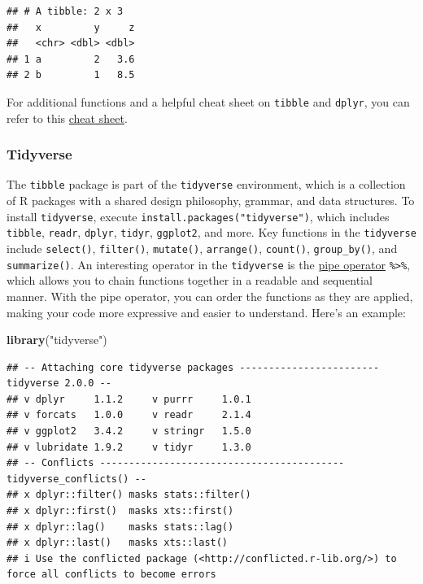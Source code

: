 \documentclass[
]{book}
\newenvironment{Shaded}{\begin{snugshade}}{\end{snugshade}}
\newcommand{\FunctionTok}[1]{\textcolor[rgb]{0.13,0.29,0.53}{\textbf{#1}}}
\newcommand{\NormalTok}[1]{#1}
\newcommand{\StringTok}[1]{\textcolor[rgb]{0.31,0.60,0.02}{#1}}
\begin{document}
\begin{verbatim}
## # A tibble: 2 x 3
##   x         y     z
##   <chr> <dbl> <dbl>
## 1 a         2   3.6
## 2 b         1   8.5
\end{verbatim}

For additional functions and a helpful cheat sheet on \texttt{tibble} and \texttt{dplyr}, you can refer to this \href{https://github.com/rstudio/cheatsheets/raw/master/data-transformation.pdf}{cheat sheet}.

\hypertarget{tidyverse}{%
\subsubsection*{Tidyverse}\label{tidyverse}}

The \texttt{tibble} package is part of the \texttt{tidyverse} environment, which is a collection of R packages with a shared design philosophy, grammar, and data structures. To install \texttt{tidyverse}, execute \texttt{install.packages("tidyverse")}, which includes \texttt{tibble}, \texttt{readr}, \texttt{dplyr}, \texttt{tidyr}, \texttt{ggplot2}, and more. Key functions in the \texttt{tidyverse} include \texttt{select()}, \texttt{filter()}, \texttt{mutate()}, \texttt{arrange()}, \texttt{count()}, \texttt{group\_by()}, and \texttt{summarize()}. An interesting operator in the \texttt{tidyverse} is the \href{https://www.datacamp.com/community/tutorials/pipe-r-tutorial}{pipe operator} \texttt{\%\textgreater{}\%}, which allows you to chain functions together in a readable and sequential manner. With the pipe operator, you can order the functions as they are applied, making your code more expressive and easier to understand. Here's an example:

\begin{Shaded}
\begin{Highlighting}[]
\FunctionTok{library}\NormalTok{(}\StringTok{"tidyverse"}\NormalTok{)}
\end{Highlighting}
\end{Shaded}

\begin{verbatim}
## -- Attaching core tidyverse packages ------------------------ tidyverse 2.0.0 --
## v dplyr     1.1.2     v purrr     1.0.1
## v forcats   1.0.0     v readr     2.1.4
## v ggplot2   3.4.2     v stringr   1.5.0
## v lubridate 1.9.2     v tidyr     1.3.0
## -- Conflicts ------------------------------------------ tidyverse_conflicts() --
## x dplyr::filter() masks stats::filter()
## x dplyr::first()  masks xts::first()
## x dplyr::lag()    masks stats::lag()
## x dplyr::last()   masks xts::last()
## i Use the conflicted package (<http://conflicted.r-lib.org/>) to force all conflicts to become errors
\end{verbatim}
\end{document}
